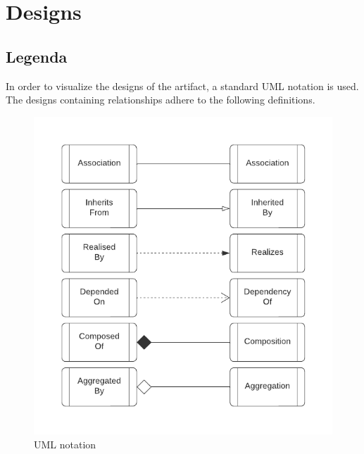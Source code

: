 \chapter{Designs} \label{appendix:designs} 

\section{Legenda} \label{appendix:legenda} 

In order to visualize the designs of the artifact, a standard UML notation is used. The
designs containing relationships adhere to the following definitions.

\begin{figure}[H]
  \centering
  \includegraphics[width=1\textwidth]{Figures/class_diagram_legenda.pdf}
  \caption[Generic architecture]{UML notation}
  \label{fi:class_diagram_relationship_notation}
\end{figure}

